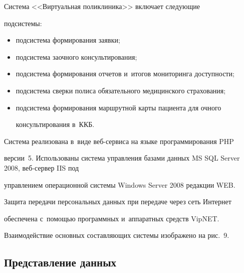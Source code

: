   


 


  Система <<Виртуальная поликлиника>> включает следующие 


подсис\-темы: 


  \begin{itemize}


  \item подсистема формирования заявки;


  \item подсистема заочного консультирования;


  \item подсистема формирования отчетов и~итогов мониторинга доступности;


  \item подсистема сверки полиса обязательного медицинского страхования;


  \item подсистема формирования маршрутной карты пациента для очного 


консультирования в~ККБ.


  \end{itemize}


  








  


  Система реализована в~виде веб-сервиса на языке программирования PHP 


версии~5. Использованы система управления базами данных MS SQL Server 2008, веб-сер\-вер IIS под 


управ\-ле\-ни\-ем операционной системы Windows Server 2008 редакции WEB. 


Защита передачи персональных данных при передаче через сеть Интернет 


обеспечена с~по\-мощью программных и~аппаратных средств VipNET. 


Взаимодействие основных составляющих системы изображено на рис.~9.


  











\subsection{Представление данных}





